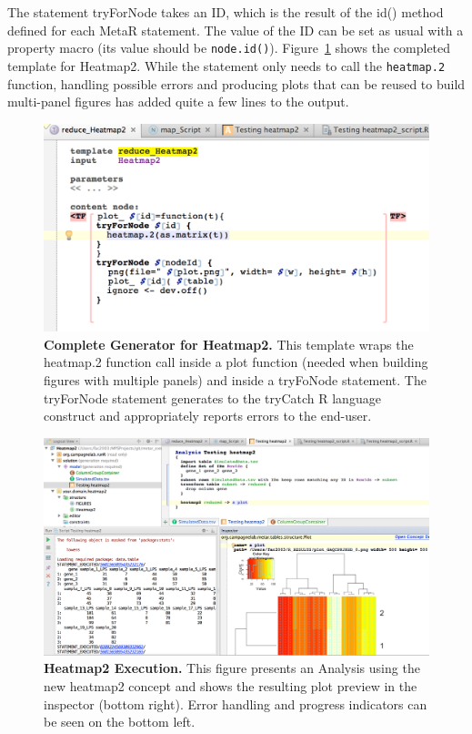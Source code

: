 The statement tryForNode takes an ID, which is the result of the id() method defined for each MetaR statement. The value of the ID can be set as usual with a property macro (its value should be \texttt{node.id()}). Figure~\ref{fig:Heatmap2GeneratorComplete} shows the completed template for Heatmap2. While the statement only needs to call the \texttt{heatmap.2} function, handling possible errors and producing plots that can be reused to build multi-panel figures has added quite a few lines to the output.

\begin{figure}[h!tbp]
  \centering
  \includegraphics[width=\figWidthWide]{figures/Heatmap2GeneratorComplete.png}
\caption[Complete Generator for Heatmap2.]{\textbf{Complete Generator for Heatmap2.} This template wraps the heatmap.2 function call inside a plot function (needed when building figures with multiple panels) and inside a tryFoNode statement. The tryForNode statement generates to the tryCatch R language construct and appropriately reports errors to the end-user.}
\label{fig:Heatmap2GeneratorComplete}
\end{figure}

 
\begin{figure}[h!tbp]
  \centering
  \includegraphics[width=\figWidthWide]{figures/Heatmap2_Execution.png}
\caption[Heatmap2 Execution.]{\textbf{Heatmap2 Execution.} This figure presents an Analysis using the new heatmap2 concept and shows the resulting plot preview in the inspector (bottom right). Error handling and progress indicators can be seen on the bottom left.}
\label{fig:Heatmap2_Execution}
\end{figure}
